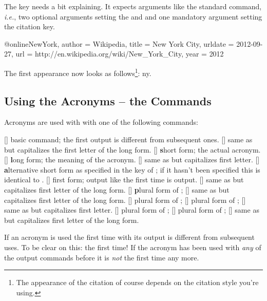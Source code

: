 \documentclass[load-preamble+,scrartcl={DIV10}]{cnltx-doc}
\newcommand*\h[1]{\textcolor{cnltx}{\textbf{#1}}}
\newcommand*\latin{\textit}
\begin{document}
The  key needs a bit explaining.  It expects arguments like the
standard  command, \latin{i.e.}, two optional arguments setting the
 and  and one mandatory argument setting the
citation key.
\begin{sourcecode}
\end{sourcecode}

\begin{sourcecode}[sourcecode-options={style=cnltx-bibtex}]
  @online{NewYork,
    author  = {Wikipedia},
    title   = {New York City},
    urldate = {2012-09-27},
    url     = {http://en.wikipedia.org/wiki/New_York_City},
    year    = {2012}
  }
\end{sourcecode}
The first appearance now looks as follows\footnote{The appearance of the
  citation of course depends on the citation style you're using.}: \acf{ny}.

\subsection{Using the Acronyms -- the Commands}
Acronyms are used with with one of the following commands:
\begin{commands}
  [\sarg{}]
    basic command; the first output is different from subsequent ones.
  [\sarg{}]
    same as  but capitalizes the first letter of the long form.
  [\sarg{}]
    \h{s}hort form; the actual acronym.
  [\sarg{}]
    \h{l}ong form; the meaning of the acronym.
  [\sarg{}] 
    same as  but capitalizes first letter.
  [\sarg{}]
    \h{a}lternative short form as specified in the  key of
    ; if it hasn't been specified this is identical to
    .
  [\sarg{}]
    first form; output like the first time  is output.
  [\sarg{}]
    same as  but capitalizes first letter of the long form.
  [\sarg{}]
    \h{p}lural form of ;
  [\sarg{}]
    same as  but capitalizes first letter of the long form.
  [\sarg{}]
    plural form of ;
  [\sarg{}]
    plural form of ;
  [\sarg{}]
    same as  but capitalizes first letter.
  [\sarg{}]
    plural form of ;
  [\sarg{}]
    plural form of ;
  [\sarg{}]
    same as  but capitalizes first letter of the long form.
\end{commands}
If an acronym is used the first time with  its output is different from
subsequent uses.  To be clear on this: the first time!  If the acronym has
been used with \emph{any} of the output commands before it is \emph{not} the
first time any more.
\end{document}
